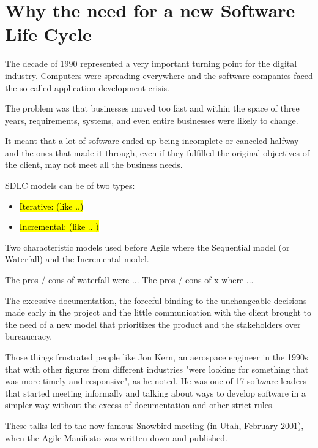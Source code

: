 \section{Why the need for a new Software Life Cycle}

	The decade of 1990 represented a very important turning point for the digital industry.
	Computers were spreading everywhere and the software companies faced the so called application development crisis.
	
	The problem was that businesses moved too fast and within the space of three years, requirements, systems, and even entire businesses were likely to change. %
	
	It meant that a lot of software ended up being incomplete or canceled halfway and the ones that made it through, even if they fulfilled the original objectives of the client, may not meet all the business needs.

	SDLC models can be of two types:
	\begin{itemize}
		\item \hl{Iterative: (like ..)}
		\item \hl{Incremental: (like .. )}
	\end{itemize}
	
	Two characteristic models used before Agile where the Sequential model (or Waterfall) and the Incremental model.

	The pros / cons of waterfall were ... 
	The pros / cons of x where ...

	The excessive documentation, the forceful binding to the unchangeable decisions made early in the project and the little communication with the client brought to the need of a new model that prioritizes the product and the stakeholders over bureaucracy. 

	Those things frustrated people like Jon Kern, an aerospace engineer in the 1990s that with other figures from different industries "were looking for something that was more timely and responsive", as he noted.
	He was one of 17 software leaders that started meeting informally and talking about ways to develop software in a simpler way without the excess of documentation and other strict rules.

	These talks led to the now famous Snowbird meeting (in Utah, February 2001), when the Agile Manifesto was written down and published.

